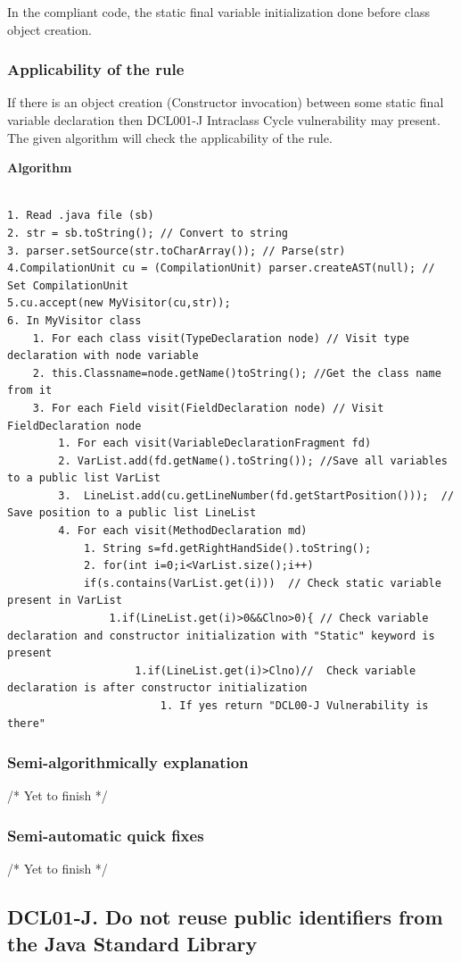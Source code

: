 In the  compliant code, the static final variable initialization done before class object creation.


\subsubsection{Applicability of the rule}
If there is an object creation (Constructor invocation) between some static final variable declaration then DCL001-J Intraclass Cycle vulnerability may present. The given algorithm will check the applicability of the rule.

\textbf{Algorithm}

\begin{lstlisting}
	
1. Read .java file (sb)
2. str = sb.toString(); // Convert to string
3. parser.setSource(str.toCharArray()); // Parse(str)
4.CompilationUnit cu = (CompilationUnit) parser.createAST(null); // Set CompilationUnit
5.cu.accept(new MyVisitor(cu,str));
6. In MyVisitor class
	1. For each class visit(TypeDeclaration node) // Visit type declaration with node variable
	2. this.Classname=node.getName()toString(); //Get the class name from it
	3. For each Field visit(FieldDeclaration node) // Visit FieldDeclaration node
		1. For each visit(VariableDeclarationFragment fd)
		2. VarList.add(fd.getName().toString()); //Save all variables to a public list VarList
		3.  LineList.add(cu.getLineNumber(fd.getStartPosition()));  // Save position to a public list LineList
		4. For each visit(MethodDeclaration md)
			1. String s=fd.getRightHandSide().toString();
			2. for(int i=0;i<VarList.size();i++)
			if(s.contains(VarList.get(i)))  // Check static variable present in VarList
				1.if(LineList.get(i)>0&&Clno>0){ // Check variable declaration and constructor initialization with "Static" keyword is present
					1.if(LineList.get(i)>Clno)//  Check variable declaration is after constructor initialization 
						1. If yes return "DCL00-J Vulnerability is there"
\end{lstlisting}
	 
\subsubsection{Semi-algorithmically explanation}
/* Yet to finish */
\subsubsection{Semi-automatic quick fixes} 
 /* Yet to finish */
\subsection{DCL01-J. Do not reuse public identifiers from the Java Standard Library}
